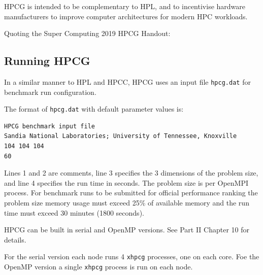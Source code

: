 \documentclass{report}
\begin{document}
HPCG is intended to be complementary to HPL, and to incentivise hardware manufacturers to improve computer architectures for modern HPC workloads. 

Quoting the Super Computing 2019 HPCG Handout:




%
%
\subsection{Running HPCG}

In a similar manner to HPL and HPCC, HPCG uses an input file \verb|hpcg.dat| for benchmark run configuration.

The format of \verb|hpcg.dat| with default parameter values is:

\lstset{style=type}
\begin{lstlisting}
HPCG benchmark input file
Sandia National Laboratories; University of Tennessee, Knoxville
104 104 104
60
\end{lstlisting}

Lines 1 and 2 are comments, line 3 specifies the 3 dimensions of the problem size, and line 4 specifies the run time in seconds. The problem size is per OpenMPI process. For benchmark runs to be submitted for official performance ranking the problem size memory usage must exceed 25\% of available memory and the run time must exceed 30 minutes (1800 seconds).

HPCG can be built in serial and OpenMP versions. See Part II Chapter 10 for details.

For the serial version each node runs 4 \verb|xhpcg| processes, one on each core. Foe the OpenMP version a single \verb|xhpcg| process is run on each node.
\end{document}
